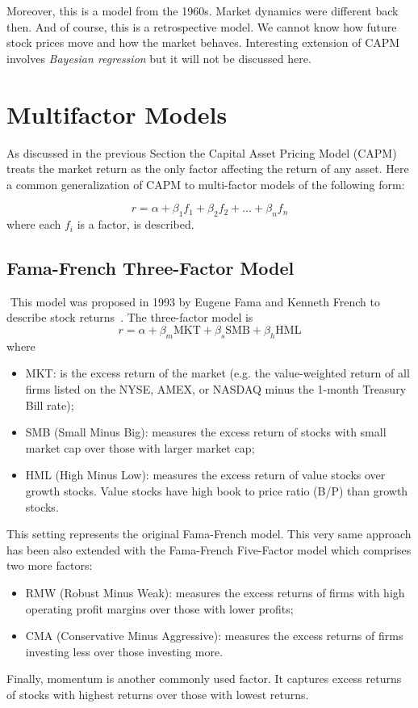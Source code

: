 Moreover, this is a model from the 1960s. Market dynamics were different back then. And of course, this is a retrospective model. We cannot know how future stock prices move and how the market behaves.
Interesting extension of CAPM involves \emph{Bayesian regression}\cite{bib:bayesian_regression} but it will not be discussed here.

\section{Multifactor Models}
As discussed in the previous Section the Capital Asset Pricing Model (CAPM) treats the market return as the only factor affecting the return of any asset. Here a common generalization of CAPM to multi-factor models of the following form:

\begin{equation}
r=\alpha + \beta_1 f_1 + \beta_2 f_2 +\ldots + \beta_n f_n
\end{equation}
where each $f_i$ is a factor, is described.

\subsection{Fama-French Three-Factor Model}
﻿
This model was proposed in 1993 by Eugene Fama and Kenneth French to describe stock returns~\cite{bib:fama_french}. The three-factor model is
\begin{equation}
r=\alpha + \beta_m \textrm{MKT} +\beta_s \textrm{SMB}+ \beta_h \textrm{HML}
\end{equation}
where
\begin{itemize}
	\tightlist
\item MKT: is the excess return of the market (e.g. the value-weighted return of all firms listed on the NYSE, AMEX, or NASDAQ minus the 1-month Treasury Bill rate);
\item SMB (Small Minus Big): measures the excess return of stocks with small market cap over those with larger market cap;
\item HML (High Minus Low): measures the excess return of value stocks over growth stocks. Value stocks have high book to price ratio (B/P) than growth stocks.
\end{itemize}

This setting represents the original Fama-French model. This very same approach has been also extended with the Fama-French Five-Factor model which comprises two more factors:
\begin{itemize}
	\tightlist
\item RMW (Robust Minus Weak): measures the excess returns of firms with high operating profit margins over those with lower profits;
\item CMA (Conservative Minus Aggressive): measures the excess returns of firms investing less over those investing more.
\end{itemize}
Finally, momentum is another commonly used factor. It captures excess returns of stocks with highest returns over those with lowest returns.

